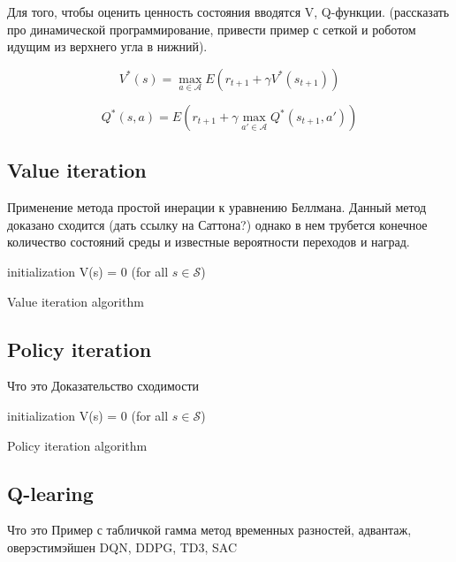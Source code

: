 Для того, чтобы оценить ценность состояния вводятся V, Q-функции. (рассказать про динамической программирование, привести пример с сеткой и роботом идущим из верхнего угла в нижний). 

\begin{equation}
	V^*(s) = \max_{a \in \mathcal{A}} E(r_{t + 1} + \gamma V^*(s_{t + 1}))
\end{equation}

\begin{equation}
Q^*(s, a) = E(r_{t + 1} + \gamma \max_{a' \in \mathcal{A}} Q^*(s_{t + 1}, a'))
\end{equation}
 
\subsection{Value iteration}

Применение метода простой инерации к уравнению Беллмана. Данный метод доказано сходится (дать ссылку на Саттона?) однако в нем трубется конечное количество состояний среды и известные вероятности переходов и наград. 

\begin{algorithm}[H]
	\SetAlgoLined
	initialization V(s) = 0 (for all $s \in \mathcal{S}$)\;
	\caption{Value iteration algorithm}
\end{algorithm}

\subsection{Policy iteration}
Что это 
Доказательство сходимости

\begin{algorithm}[H]
	\SetAlgoLined
	initialization V(s) = 0 (for all $s \in \mathcal{S}$)\;
	\caption{Policy iteration algorithm}
\end{algorithm}

\subsection{Q-learing}
Что это
Пример с табличкой
гамма
метод временных разностей, адвантаж, оверэстимэйшен 
DQN, DDPG, TD3, SAC


